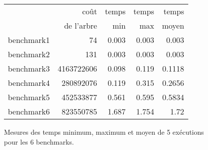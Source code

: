 \documentclass{article}
\begin{document}
    \begin{figure}[H]
      \begin{center}
        \begin{tabular}{|l||r||r|r|r||}
          \hline
          \hline
                        & coût         & temps     & temps   & temps \\
                        & de l'arbre     & min       & max     & moyen \\
          \hline
          \hline
            benchmark1      & 74          & 0.003   & 0.003     & 0.003     \\
          \hline
            benchmark2      & 131         & 0.003   & 0.003     & 0.003     \\
          \hline
            benchmark3      & 4163722606  & 0.098   & 0.119     & 0.1118    \\
          \hline
            benchmark4      & 280892076   & 0.119   & 0.315     & 0.2656    \\
          \hline
            benchmark5      & 452533877   & 0.561   & 0.595     & 0.5834    \\
          \hline
            benchmark6      & 823550785   & 1.687   & 1.754     & 1.72      \\
          \hline
          \hline
        \end{tabular}
        \caption{Mesures des temps minimum, maximum et moyen de 5 exécutions pour les 6 benchmarks.}
        \label{table-temps}
      \end{center}
    \end{figure}
    
\end{document}
